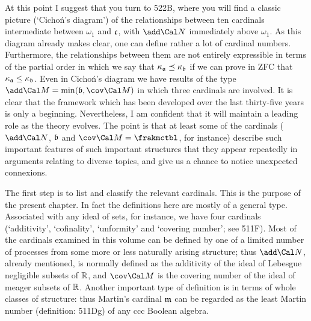 At this point I suggest that you turn to 522B, where you will find a 
classic picture (`Cicho\'n's diagram') of the relationships between ten 
cardinals intermediate between $\omega_1$ and $\frak c$, with 
$\add\Cal N$ immediately above $\omega_1$.   As this diagram already 
makes clear, one can define rather a lot of cardinal numbers. 
Furthermore, the relationships between them are not entirely expressible 
in terms of the partial order in which we say that 
$\kappa_{\frak a}\preceq\kappa_{\frak b}$ if we can prove in ZFC that 
$\kappa_{\frak a}\le\kappa_{\frak b}$.   Even in Cicho\'n's diagram we 
have results of the type $\add\Cal M=\min(\frak b,\cov\Cal M)$ in which 
three cardinals are involved.   It is clear that the framework which has 
been developed over the last thirty-five years is only a beginning. 
Nevertheless, I am confident that it will maintain a leading role as the 
theory evolves.   The point is that at least some of the cardinals 
($\add\Cal N$, $\frak b$ and $\cov\Cal M=\frakmctbl$, for instance) 
describe such 
important features of such important structures that they appear 
repeatedly in arguments relating to diverse topics, and give us a chance 
to notice unexpected connexions. 
      
The first step is to list and classify the relevant cardinals.   This is 
the purpose of the present chapter.   In fact the definitions here are 
mostly of a general type.   Associated with any ideal of sets, for 
instance, we have four cardinals (`additivity', `cofinality', 
`unformity' and `covering number';  see 511F).   Most of the cardinals 
examined in this volume can be defined by one of a limited number of 
processes from some more or less naturally arising structure;  thus 
$\add\Cal N$, already mentioned, is normally defined as the additivity 
of the ideal of Lebesgue negligible subsets of $\Bbb R$, and 
$\cov\Cal M$ is the covering number of the ideal of meager subsets of  
$\Bbb R$.   Another 
important type of definition is in terms of whole classes of structure: 
thus Martin's cardinal $\frak m$ can be regarded as the least Martin 
number (definition:  511Dg) of any ccc Boolean algebra. 
      
